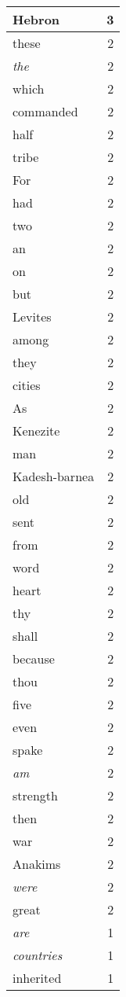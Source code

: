 \begin{center}
\begin{longtable}{l|r}
Hebron & 3\\ \hline 
these & 2\\ \hline 
\emph{the} & 2\\ \hline 
which & 2\\ \hline 
commanded & 2\\ \hline 
half & 2\\ \hline 
tribe & 2\\ \hline 
For & 2\\ \hline 
had & 2\\ \hline 
two & 2\\ \hline 
an & 2\\ \hline 
on & 2\\ \hline 
but & 2\\ \hline 
Levites & 2\\ \hline 
among & 2\\ \hline 
they & 2\\ \hline 
cities & 2\\ \hline 
As & 2\\ \hline 
Kenezite & 2\\ \hline 
man & 2\\ \hline 
Kadesh-barnea & 2\\ \hline 
old & 2\\ \hline 
sent & 2\\ \hline 
from & 2\\ \hline 
word & 2\\ \hline 
heart & 2\\ \hline 
thy & 2\\ \hline 
shall & 2\\ \hline 
because & 2\\ \hline 
thou & 2\\ \hline 
five & 2\\ \hline 
even & 2\\ \hline 
spake & 2\\ \hline 
\emph{am} & 2\\ \hline 
strength & 2\\ \hline 
then & 2\\ \hline 
war & 2\\ \hline 
Anakims & 2\\ \hline 
\emph{were} & 2\\ \hline 
great & 2\\ \hline 
\emph{are} & 1\\ \hline 
\emph{countries} & 1\\ \hline 
inherited & 1\\ \hline 

\end{longtable}
\end{center}
